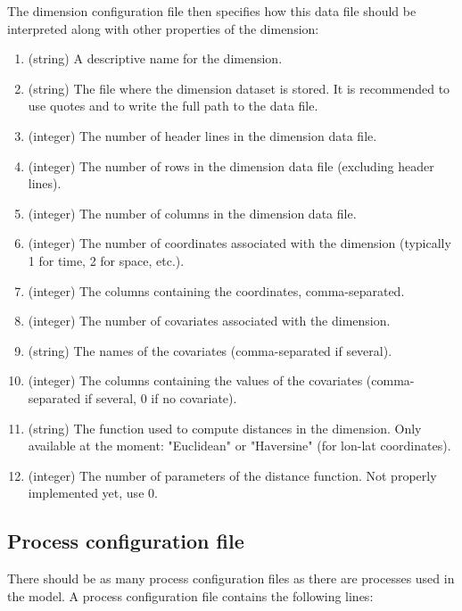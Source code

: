 \documentclass[a4paper]{article}
\begin{document}
	The dimension configuration file then specifies how this data file should be interpreted along with other properties of the dimension:
	
	\begin{enumerate}
		\item (string) A descriptive name for the dimension.
		\item (string) The file where the dimension dataset is stored. It is recommended to use quotes and to write the full path to the data file.
		\item (integer) The number of header lines in the dimension data file.
		\item (integer) The number of rows in the dimension data file (excluding header lines).
		\item (integer) The number of columns in the dimension data file.
		\item (integer) The number of coordinates associated with the dimension (typically 1 for time, 2 for space, etc.).
		\item (integer) The columns containing the coordinates, comma-separated.
		\item (integer) The number of covariates associated with the dimension.
		\item (string) The names of the covariates (comma-separated if several).
		\item (integer) The columns containing the values of the covariates (comma-separated if several, 0 if no covariate).
		\item (string) The function used to compute distances in the dimension. Only available at the moment: "Euclidean" or "Haversine" (for lon-lat coordinates). 
		\item (integer) The number of parameters of the distance function. Not properly implemented yet, use 0.
	\end{enumerate}
	
	\subsection{Process configuration file}
	
	There should be as many process configuration files as there are processes used in the model. A process configuration file contains the following lines:
	
\end{document}
